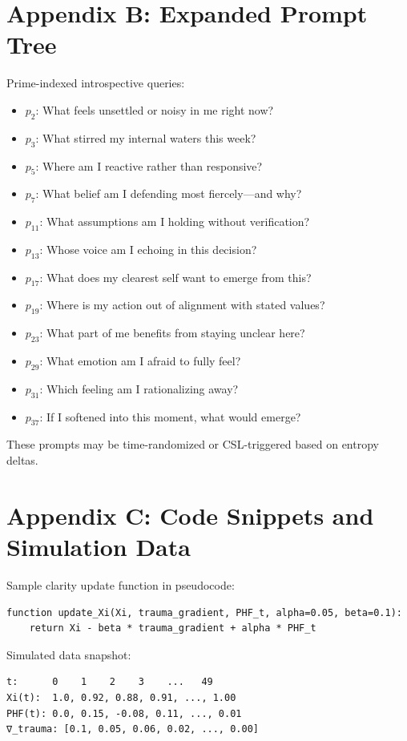 \documentclass[12pt]{article}
\begin{document}
\section{Appendix B: Expanded Prompt Tree}

Prime-indexed introspective queries:

\begin{itemize}
  \item $p_2$: What feels unsettled or noisy in me right now?
  \item $p_3$: What stirred my internal waters this week?
  \item $p_5$: Where am I reactive rather than responsive?
  \item $p_7$: What belief am I defending most fiercely—and why?
  \item $p_{11}$: What assumptions am I holding without verification?
  \item $p_{13}$: Whose voice am I echoing in this decision?
  \item $p_{17}$: What does my clearest self want to emerge from this?
  \item $p_{19}$: Where is my action out of alignment with stated values?
  \item $p_{23}$: What part of me benefits from staying unclear here?
  \item $p_{29}$: What emotion am I afraid to fully feel?
  \item $p_{31}$: Which feeling am I rationalizing away?
  \item $p_{37}$: If I softened into this moment, what would emerge?
\end{itemize}

These prompts may be time-randomized or CSL-triggered based on entropy deltas.

\section{Appendix C: Code Snippets and Simulation Data}

Sample clarity update function in pseudocode:

\begin{verbatim}
function update_Xi(Xi, trauma_gradient, PHF_t, alpha=0.05, beta=0.1):
    return Xi - beta * trauma_gradient + alpha * PHF_t
\end{verbatim}

Simulated data snapshot:

\begin{verbatim}
t:      0    1    2    3    ...   49
Xi(t):  1.0, 0.92, 0.88, 0.91, ..., 1.00
PHF(t): 0.0, 0.15, -0.08, 0.11, ..., 0.01
∇_trauma: [0.1, 0.05, 0.06, 0.02, ..., 0.00]
\end{verbatim}
\end{document}
